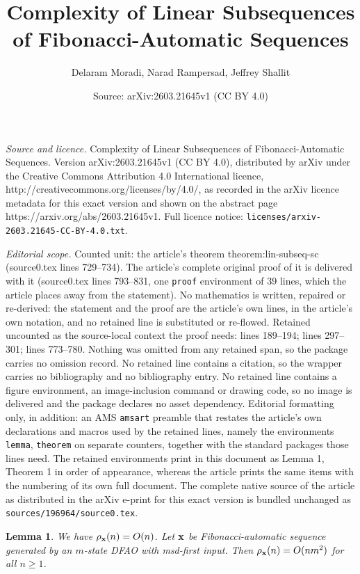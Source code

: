 \documentclass[10pt,a4paper]{amsart}
\title{Complexity of Linear Subsequences of Fibonacci-Automatic Sequences}
\author{Delaram Moradi, Narad Rampersad, Jeffrey Shallit}
\date{Source: arXiv:2603.21645v1 (CC BY 4.0)}
\newtheorem{lemma}{Lemma}
\begin{document}
\maketitle

\noindent\emph{Source and licence.} Complexity of Linear Subsequences of Fibonacci-Automatic Sequences. Version arXiv:2603.21645v1 (CC BY 4.0), distributed by arXiv under the Creative Commons Attribution 4.0 International licence, http://creativecommons.org/licenses/by/4.0/, as recorded in the arXiv licence metadata for this exact version and shown on the abstract page https://arxiv.org/abs/2603.21645v1. Full licence notice: \texttt{licenses/arxiv-2603.21645-CC-BY-4.0.txt}.\par\smallskip

\noindent\textit{Editorial scope.} Counted unit: the article's theorem theorem:lin-subseq-sc (source0.tex lines 729--734). The article's complete original proof of it is delivered with it (source0.tex lines 793--831, one \texttt{proof} environment of 39 lines, which the article places away from the statement). No mathematics is written, repaired or re-derived: the statement and the proof are the article's own lines, in the article's own notation, and no retained line is substituted or re-flowed.  Retained uncounted as the source-local context the proof needs: lines 189--194; lines 297--301; lines 773--780.  Nothing was omitted from any retained span, so the package carries no omission record.  No retained line contains a citation, so the wrapper carries no bibliography and no bibliography entry.  No retained line contains a figure environment, an image-inclusion command or drawing code, so no image is delivered and the package declares no asset dependency.  Editorial formatting only, in addition: an AMS \texttt{amsart} preamble that restates the article's own declarations and macros used by the retained lines, namely the environments \texttt{lemma}, \texttt{theorem} on separate counters, together with the standard packages those lines need.  The retained environments print in this document as Lemma 1, Theorem 1 in order of appearance, whereas the article prints the same items with the numbering of its own full document.  The complete native source of the article as distributed in the arXiv e-print for this exact version is bundled unchanged as \texttt{sources/196964/source0.tex}.
\begin{lemma}
We have $\rho_{\bf x}(n) = O(n)$.
\label{lemma:subword-sc}
Let ${\bf x}$ be  Fibonacci-automatic sequence generated by an $m$-state DFAO with msd-first input.
Then $\rho_{\bf x} (n) = O(n m^2)$ for all $n \geq 1$. 
\end{lemma}
\end{document}
